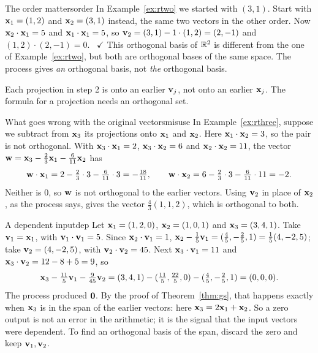 \documentclass[11pt]{article}
\begin{document}
\begin{exmp}{The order matters}{order}
In Example~\ref{ex:rtwo} we started with $(3,1)$. Start with $\mathbf{x}_1=(1,2)$ and $\mathbf{x}_2=(3,1)$ instead, the same two vectors in the other order. Now $\mathbf{x}_2\cdot\mathbf{x}_1=5$ and $\mathbf{x}_1\cdot\mathbf{x}_1=5$, so $\mathbf{v}_2=(3,1)-1\cdot(1,2)=(2,-1)$ and $(1,2)\cdot(2,-1)=0$. \ $\checkmark$ This orthogonal basis of $\mathbb{R}^2$ is different from the one of Example~\ref{ex:rtwo}, but both are orthogonal bases of the same space. The process gives \emph{an} orthogonal basis, not \emph{the} orthogonal basis.
\end{exmp}

\begin{warn}
Each projection in step 2 is onto an earlier $\mathbf{v}_j$, not onto an earlier $\mathbf{x}_j$. The formula for a projection needs an orthogonal set.
\end{warn}

\begin{exmp}{What goes wrong with the original vectors}{misuse}
In Example~\ref{ex:rthree}, suppose we subtract from $\mathbf{x}_3$ its projections onto $\mathbf{x}_1$ and $\mathbf{x}_2$. Here $\mathbf{x}_1\cdot\mathbf{x}_2=3$, so the pair is not orthogonal. With $\mathbf{x}_3\cdot\mathbf{x}_1=2$, $\mathbf{x}_3\cdot\mathbf{x}_2=6$ and $\mathbf{x}_2\cdot\mathbf{x}_2=11$, the vector $\mathbf{w}=\mathbf{x}_3-\tfrac23\mathbf{x}_1-\tfrac6{11}\mathbf{x}_2$ has
\[
\mathbf{w}\cdot\mathbf{x}_1=2-\tfrac23\cdot3-\tfrac6{11}\cdot3=-\tfrac{18}{11},\qquad\mathbf{w}\cdot\mathbf{x}_2=6-\tfrac23\cdot3-\tfrac6{11}\cdot11=-2 .
\]
Neither is $0$, so $\mathbf{w}$ is not orthogonal to the earlier vectors. Using $\mathbf{v}_2$ in place of $\mathbf{x}_2$, as the process says, gives the vector $\tfrac43(1,1,2)$, which is orthogonal to both.
\end{exmp}

\begin{exmp}{A dependent input}{dep}
Let $\mathbf{x}_1=(1,2,0)$, $\mathbf{x}_2=(1,0,1)$ and $\mathbf{x}_3=(3,4,1)$. Take $\mathbf{v}_1=\mathbf{x}_1$, with $\mathbf{v}_1\cdot\mathbf{v}_1=5$. Since $\mathbf{x}_2\cdot\mathbf{v}_1=1$, $\mathbf{x}_2-\tfrac15\mathbf{v}_1=(\tfrac45,-\tfrac25,1)=\tfrac15(4,-2,5)$; take $\mathbf{v}_2=(4,-2,5)$, with $\mathbf{v}_2\cdot\mathbf{v}_2=45$. Next $\mathbf{x}_3\cdot\mathbf{v}_1=11$ and $\mathbf{x}_3\cdot\mathbf{v}_2=12-8+5=9$, so
\[
\mathbf{x}_3-\tfrac{11}5\mathbf{v}_1-\tfrac9{45}\mathbf{v}_2=(3,4,1)-(\tfrac{11}5,\tfrac{22}5,0)-(\tfrac45,-\tfrac25,1)=(0,0,0).
\]
The process produced $\mathbf{0}$. By the proof of Theorem~\ref{thm:gs}, that happens exactly when $\mathbf{x}_3$ is in the span of the earlier vectors: here $\mathbf{x}_3=2\mathbf{x}_1+\mathbf{x}_2$. So a zero output is not an error in the arithmetic; it is the signal that the input vectors were dependent. To find an orthogonal basis of the span, discard the zero and keep $\mathbf{v}_1,\mathbf{v}_2$.
\end{exmp}
\end{document}
